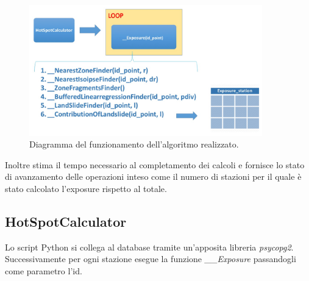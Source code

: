 \begin{figure}[h]
	\centering
	\includegraphics[width=0.9\textwidth]{images/algorithm}
	\caption{Diagramma del funzionamento dell'algoritmo realizzato.}
	\label{diagramma_algoritmo}
\end{figure}

Inoltre stima il tempo necessario al completamento dei calcoli e fornisce lo stato di avanzamento delle operazioni inteso come il numero di stazioni per il quale è stato calcolato l'exposure rispetto al totale.


\subsection{HotSpotCalculator}
Lo script Python si collega al database tramite un'apposita libreria \textit{psycopg2}. Successivamente per ogni stazione esegue la funzione \textit{\_\_Exposure} passandogli come parametro l'id. 

